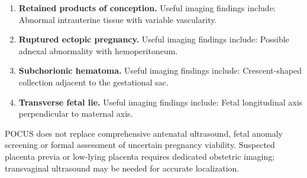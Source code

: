 \begin{enumerate}[leftmargin=*,itemsep=0.45em,topsep=0.4em]
\item \textbf{Retained products of conception.} Useful imaging findings include: Abnormal intrauterine tissue with variable vascularity.
\item \textbf{Ruptured ectopic pregnancy.} Useful imaging findings include: Possible adnexal abnormality with hemoperitoneum.
\item \textbf{Subchorionic hematoma.} Useful imaging findings include: Crescent-shaped collection adjacent to the gestational sac.
\item \textbf{Transverse fetal lie.} Useful imaging findings include: Fetal longitudinal axis perpendicular to maternal axis.
\end{enumerate}
POCUS does not replace comprehensive antenatal ultrasound, fetal anomaly screening or formal assessment of uncertain pregnancy viability. Suspected placenta previa or low-lying placenta requires dedicated obstetric imaging; transvaginal ultrasound may be needed for accurate localization.

